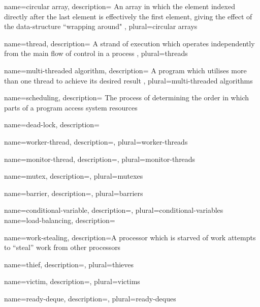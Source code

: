 {
    name={circular array},
    description={
        An array in which the element indexed directly after the last element 
        is effectively the first element, giving the effect of the 
        data-structure ``wrapping around"
    },
    plural={circular arrays}
}

{
    name={thread},
    description={
        A strand of execution which operates independently from the main flow of
        control in a process
    },
    plural={threads}
}

{
    name={multi-threaded algorithm},
    description={
        A program which utilises more than one thread to achieve its desired 
        result
    },
    plural={multi-threaded algorithms}
}

{
    name={scheduling},
    description={
        The process of determining the order in which parts of a program access
        system resources
    }
}

{
    name={dead-lock},
    description={}
}

{
    name={worker-thread},
    description={},
    plural={worker-threads}
}

{
    name={monitor-thread},
    description={},
    plural={monitor-threads}
}

{
    name={mutex},
    description={},
    plural={mutexes}
}

{
    name={barrier},
    description={},
    plural={barriers}
}

{
    name={conditional-variable},
    description={},
    plural={conditional-variables}
}
{
    name={load-balancing},
    description={}
}

{
    name={work-stealing},
    description={A processor which is starved of work attempts to ``steal'' 
                 work from other processors}
}

{
    name={thief},
    description={},
    plural={thieves}
}

{
    name={victim},
    description={},
    plural={victims}
}

{
    name={ready-deque},
    description={},
    plural={ready-deques}
}


